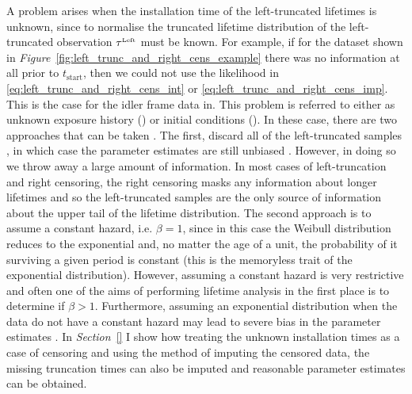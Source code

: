 A problem arises when the installation time of the left-truncated lifetimes is unknown, since to normalise the truncated lifetime distribution of the left-truncated observation $\tau^{\hbox{\tiny{Left}}}$ must be known. For example, if for the dataset shown in \textit{Figure}~\ref{fig:left_trunc_and_right_cens_example} there was no information at all prior to $t_\text{start}$, then we could not use the likelihood in \ref{eq:left_trunc_and_right_cens_int} or \ref{eq:left_trunc_and_right_cens_imp}. This is the case for the idler frame data in. This problem is referred to either as unknown exposure history () or initial conditions (). In these case, there are two approaches that can be taken \citep{guo1993}. The first, discard all of the left-truncated samples \citep{}, in which case the parameter estimates are still unbiased \citep{}. However, in doing so we throw away a large amount of information. In most cases of left-truncation and right censoring, the right censoring masks any information about longer lifetimes and so the left-truncated samples are the only source of information about the upper tail of the lifetime distribution. The second approach is to assume a constant hazard, i.e. $\beta = 1$, since in this case the Weibull distribution reduces to the exponential and, no matter the age of a unit, the probability of it surviving a given period is constant (this is the memoryless trait of the exponential distribution). However, assuming a constant hazard is very restrictive and often one of the aims of performing lifetime analysis in the first place is to determine if $\beta > 1$. Furthermore, assuming an exponential distribution when the data do not have a constant hazard may lead to severe bias in the parameter estimates \citep{heckman1986}. In \textit{Section}~\ref{}
I show how treating the unknown installation times as a case of censoring and using the method of imputing the censored data, the missing truncation times can also be imputed and reasonable parameter estimates can be obtained.

